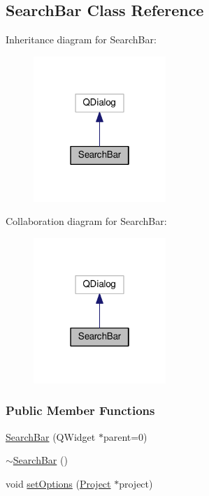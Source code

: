 \hypertarget{class_search_bar}{}\subsection{Search\+Bar Class Reference}
\label{class_search_bar}


Inheritance diagram for Search\+Bar\+:\nopagebreak
\begin{figure}[H]
\begin{center}
\leavevmode
\includegraphics[width=142pt]{class_search_bar__inherit__graph}
\end{center}
\end{figure}


Collaboration diagram for Search\+Bar\+:\nopagebreak
\begin{figure}[H]
\begin{center}
\leavevmode
\includegraphics[width=142pt]{class_search_bar__coll__graph}
\end{center}
\end{figure}
\subsubsection*{Public Member Functions}
\begin{DoxyCompactItemize}
\item 
\hyperlink{class_search_bar_a75f8caf009094148f56149b00996ac84}{Search\+Bar} (Q\+Widget $\ast$parent=0)
\item 
\hyperlink{class_search_bar_a553f2c7b9c15e7ae39cf988a6ef8f786}{$\sim$\+Search\+Bar} ()
\item 
void \hyperlink{class_search_bar_a840eb8fbdea559d31a7c2af6a4cbc480}{set\+Options} (\hyperlink{class_project}{Project} $\ast$project)
\end{DoxyCompactItemize}


